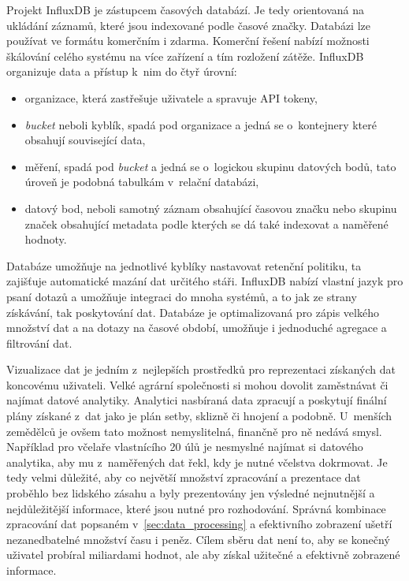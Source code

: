 \label{sec:influxDB}
Projekt InfluxDB je zástupcem časových databází. Je tedy orientovaná na ukládání záznamů, které jsou indexované podle časové značky. Databázi lze používat ve formátu komerčním i zdarma. Komerční řešení nabízí možnosti škálování celého systému na více zařízení a tím rozložení zátěže. InfluxDB organizuje data a přístup k~nim do čtyř úrovní:
\begin{itemize}
    \item organizace, která zastřešuje uživatele a spravuje API tokeny,
    \item \textit{bucket} neboli kyblík, spadá pod organizace a jedná se o~kontejnery které obsahují související data,
    \item měření, spadá pod \textit{bucket} a jedná se o~logickou skupinu datových bodů, tato úroveň je podobná tabulkám v~relační databázi,
    \item datový bod, neboli samotný záznam obsahující časovou značku nebo skupinu značek obsahující metadata podle kterých se dá také indexovat a naměřené hodnoty.
\end{itemize}
Databáze umožňuje na jednotlivé kyblíky nastavovat retenční politiku, ta zajišťuje automatické mazání dat určitého stáři. InfluxDB nabízí vlastní jazyk pro psaní dotazů a umožňuje integraci do mnoha systémů, a to jak ze strany získávání, tak poskytování dat. Databáze je optimalizovaná pro zápis velkého množství dat a na dotazy na časové období, umožňuje i jednoduché agregace a filtrování dat. \cite{influxDB}

 \label{sec:data_visualisation}
Vizualizace dat je jedním z~nejlepších prostředků pro reprezentaci získaných dat koncovému uživateli. Velké agrární společnosti si mohou dovolit zaměstnávat či najímat datové analytiky. Analytici nasbíraná data zpracují a poskytují finální plány získané z~dat jako je plán setby, sklizně či hnojení a podobně. U~menších zemědělců je ovšem tato možnost nemyslitelná, finančně pro ně nedává smysl. Například pro včelaře vlastnícího 20 úlů je nesmyslné najímat si datového analytika, aby mu z~naměřených dat řekl, kdy je nutné včelstva dokrmovat. Je tedy velmi důležité, aby co největší množství zpracování a prezentace dat proběhlo bez lidského zásahu a byly prezentovány jen výsledné nejnutnější a nejdůležitější informace, které jsou nutné pro rozhodování. Správná kombinace zpracování dat popsaném v~\ref{sec:data_processing} a efektivního zobrazení ušetří nezanedbatelné množství času i peněz. Cílem sběru dat není to, aby se konečný uživatel probíral miliardami hodnot, ale aby získal užitečné a efektivně zobrazené informace.

